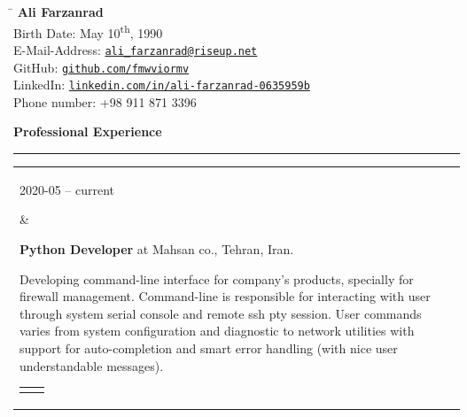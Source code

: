 \documentclass[11pt,a4paper,oneside]{article}
\makeatletter
\newcommand{\https}[1]{\href{https://#1}{\nolinkurl{#1}}}
\newcommand{\mailto}[1]{\href{mailto://#1}{\nolinkurl{#1}}}
\newcommand{\prog}{Programming Lang.:}
\newcommand{\os}{Operating System:}
\newcommand{\vcs}{Version Controls:}
\newcommand{\issue}{Issue Tracking:}
\renewcommand{\section}[1]{%
{\large\textbf{#1}}\\
\rule[9pt]{18cm}{.4pt}\vspace{-15pt}%
}
\newenvironment{mytable}{%
\begin{tabular}{@{}l@{\hspace{4mm}}l@{}}%
}{\end{tabular}}
\newcommand{\myitem}[2]{%
\parbox[t]{16mm}{#1}&\parbox[t]{16cm}{#2}\\%
}
\newenvironment{innertable}{%
\begin{tabular}{@{}l@{\hspace{5mm}}l@{}}%
}{\end{tabular}}
\newcommand{\inneritem}[2]{%
\parbox{35mm}{{\color{darkgray}#1}}&\parbox{12cm}{#2}\\%
}
\makeatother
\begin{document}
%
%
\hspace{1cm}%
\parbox[b]{12cm}{%
\begin{tabbing}%
\hspace{3cm}\=\kill%
\textbf{{\LARGE Ali Farzanrad}}\\[5mm]
Birth Date: \>
May 10\textsuperscript{th}, 1990\\[1mm]
E-Mail-Address: \>
\mailto{ali_farzanrad@riseup.net}\\[1mm]
GitHub: \>
\https{github.com/fmwviormv}\\[1mm]
LinkedIn: \>
\https{linkedin.com/in/ali-farzanrad-0635959b}\\[1mm]
Phone number: \>
+98{ }911{ }871{ }3396\\
\end{tabbing}%
}

\section{Professional Experience}

\begin{mytable}
\myitem{2020-05 -- current}{%
\textbf{Python Developer} at
Mahsan co., Tehran, Iran.

Developing command-line interface for company's products,
specially for firewall management.
Command-line is responsible for interacting with user through
system serial console and remote ssh pty session.
User commands varies from system configuration and diagnostic
to network utilities with support for auto-completion and
smart error handling (with nice user understandable messages).

\begin{innertable}
\inneritem{\prog}{Python 3}
\inneritem{\os}{Ubuntu}
\inneritem{\vcs}{Git}
\inneritem{\issue}{Gitlab}
\end{innertable}
}
\end{mytable}
\end{document}
